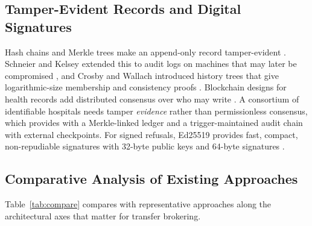 \subsection{Tamper-Evident Records and Digital Signatures}
Hash chains and Merkle trees make an append-only record tamper-evident \cite{merkle1988signature,haber1991timestamp}. Schneier and Kelsey extended this to audit logs on machines that may later be compromised \cite{schneier1999audit}, and Crosby and Wallach introduced history trees that give logarithmic-size membership and consistency proofs \cite{crosby2009tamper}. Blockchain designs for health records add distributed consensus over who may write \cite{azaria2016medrec}. A consortium of identifiable hospitals needs tamper \emph{evidence} rather than permissionless consensus, which \mahros{} provides with a Merkle-linked ledger and a trigger-maintained audit chain with external checkpoints. For signed refusals, Ed25519 provides fast, compact, non-repudiable signatures with 32-byte public keys and 64-byte signatures \cite{bernstein2012ed25519}.

\subsection{Comparative Analysis of Existing Approaches}
Table~\ref{tab:compare} compares \mahros{} with representative approaches along the architectural axes that matter for transfer brokering.

